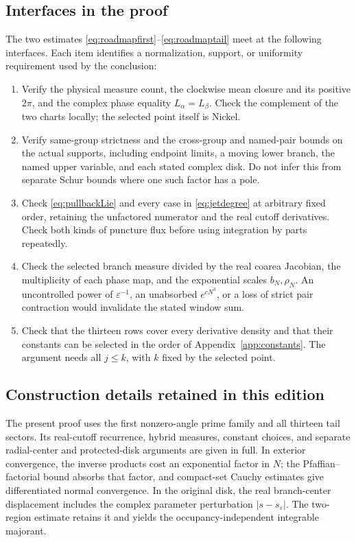\documentclass[11pt]{article}
\numberwithin{equation}{section}
\theoremstyle{definition}
\newcommand{\eps}{\varepsilon}
\newcommand{\se}{s_\varepsilon}
\begin{document}
\subsection{Interfaces in the proof}
The two estimates \eqref{eq:roadmapfirst}--\eqref{eq:roadmaptail}
meet at the following interfaces. Each item identifies a normalization,
support, or uniformity requirement used by the conclusion:
\begin{enumerate}
\item Verify the physical measure count, the clockwise mean
closure and its positive \(2\pi\), and the complex phase
equality \(L_\alpha=L_\beta\). Check the complement of the
two charts locally; the selected point itself is Nickel.
\item Verify same-group strictness and the cross-group and named-pair
bounds on the actual supports, including endpoint limits, a moving
lower branch, the named upper variable, and each stated
complex disk. Do not infer this from separate Schur bounds
where one such factor has a pole.
\item Check \eqref{eq:pullbackLie} and every case in
\eqref{eq:jetdegree} at arbitrary fixed order, retaining the
unfactored numerator and the real cutoff derivatives.
Check both kinds of puncture flux before using integration
by parts repeatedly.
\item Check the selected branch measure divided by the real
coarea Jacobian, the multiplicity of each phase map, and
the exponential scales \(b_N,\rho_N\).
An uncontrolled power of \(\eps^{-1}\), an unabsorbed
\(e^{cN^3}\), or a loss of strict pair contraction would
invalidate the stated window sum.
\item Check that the thirteen rows cover every derivative
density and that their constants can be selected in the
order of Appendix~\ref{app:constants}. The argument needs
all \(j\le k\), with \(k\) fixed by the selected point.
\end{enumerate}

\subsection{Construction details retained in this edition}
The present proof uses the first nonzero-angle prime family and all
thirteen tail sectors. Its real-cutoff recurrence, hybrid measures,
constant choices, and separate radial-center and protected-disk
arguments are given in full. In exterior convergence, the inverse
products cost an exponential factor in \(N\); the
Pfaffian--factorial bound absorbs that factor, and compact-set Cauchy
estimates give differentiated normal convergence. In the original disk,
the real branch-center displacement includes the complex parameter
perturbation \(|s-\se|\). The two-region estimate retains it and yields the
occupancy-independent integrable majorant.
\end{document}
